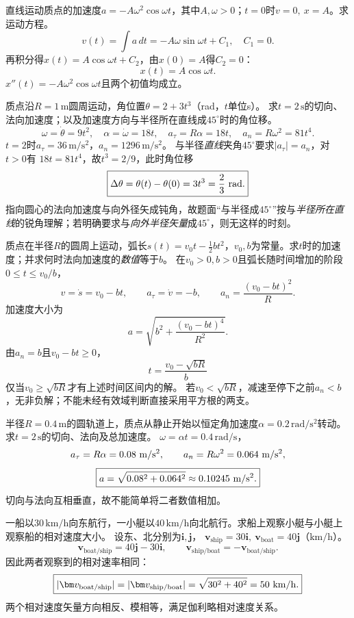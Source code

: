 \problemtext 直线运动质点的加速度$a=-A\omega^2\cos\omega t$，其中$A,\omega>0$；$t=0$时$v=0,\ x=A$。求运动方程。
\workings
\[
v(t)=\int a\,dt=-A\omega\sin\omega t+C_1,\quad C_1=0.
\]
再积分得$x(t)=A\cos\omega t+C_2$，由$x(0)=A$得$C_2=0$：
\[
\boxed{x(t)=A\cos\omega t.}
\]
\crosscheck $x''(t)=-A\omega^2\cos\omega t$且两个初值均成立。

\problemtext 质点沿$R=1\,\mathrm m$圆周运动，角位置$\theta=2+3t^3$（rad，$t$单位s）。
求$t=2\,\mathrm s$的切向、法向加速度；以及加速度方向与半径所在直线成$45^\circ$时的角位移。
\workings
\[
\omega=\dot\theta=9t^2,\quad \alpha=\dot\omega=18t,\quad
a_\tau=R\alpha=18t,\quad a_n=R\omega^2=81t^4.
\]
$t=2$时$a_\tau=36\,\mathrm{m/s^2}$，$a_n=1296\,\mathrm{m/s^2}$。
与半径\emph{直线}夹角$45^\circ$要求$|a_\tau|=a_n$，对$t>0$有
$18t=81t^4$，故$t^3=2/9$，此时角位移
\[
\boxed{\Delta\theta=\theta(t)-\theta(0)=3t^3=\frac23\ {\rm rad}.}
\]
\crosscheck 指向圆心的法向加速度与向外径矢成钝角，故题面“与半径成$45^\circ$”按与\emph{半径所在直线}的锐角理解；若明确要求与\emph{向外半径矢量}成$45^\circ$，则无这样的时刻。

\problemtext 质点在半径$R$的圆周上运动，弧长$s(t)=v_0t-\frac12bt^2$，$v_0,b$为常量。求$t$时的加速度；并求何时法向加速度的\emph{数值}等于$b$。
\workings
在$v_0>0,b>0$且弧长随时间增加的阶段$0\le t\le v_0/b$，
\[
v=\dot s=v_0-bt,\qquad
a_\tau=\dot v=-b,\qquad a_n=\frac{(v_0-bt)^2}{R}.
\]
加速度大小为
\[
a=\sqrt{b^2+\frac{(v_0-bt)^4}{R^2}}.
\]
由$a_n=b$且$v_0-bt\ge0$，
\[
\boxed{t=\frac{v_0-\sqrt{bR}}{b}}
\]
仅当$v_0\ge\sqrt{bR}$才有上述时间区间内的解。
\crosscheck 若$v_0<\sqrt{bR}$，减速至停下之前$a_n<b$，无非负解；不能未经有效域判断直接采用平方根的两支。

\problemtext 半径$R=0.4\,\mathrm m$的圆轨道上，质点从静止开始以恒定角加速度$\alpha=0.2\,\mathrm{rad/s^2}$转动。求$t=2\,\mathrm s$的切向、法向及总加速度。
\workings
$\omega=\alpha t=0.4\,\mathrm{rad/s}$，
\[
a_\tau=R\alpha=0.08\ {\rm m/s^2},\qquad
a_n=R\omega^2=0.064\ {\rm m/s^2},
\]
\[
\boxed{a=\sqrt{0.08^2+0.064^2}\approx0.10245\ {\rm m/s^2}.}
\]
\crosscheck 切向与法向互相垂直，故不能简单将二者数值相加。

\problemtext 一船以$30\,\mathrm{km/h}$向东航行，一小艇以$40\,\mathrm{km/h}$向北航行。求船上观察小艇与小艇上观察船的相对速度大小。
\workings
设东、北分别为$\bm i,\bm j$，
$\bm v_{\mathrm{ship}}=30\bm i,\ \bm v_{\mathrm{boat}}=40\bm j$（$\mathrm{km/h}$）。
\[
\bm v_{\mathrm{boat/ship}}=40\bm j-30\bm i,\qquad
\bm v_{\mathrm{ship/boat}}=-\bm v_{\mathrm{boat/ship}}.
\]
因此两者观察到的相对速率相同：
\[
\boxed{|\bm v_{\mathrm{boat/ship}}|=|\bm v_{\mathrm{ship/boat}}|
=\sqrt{30^2+40^2}=50\ {\rm km/h}.}
\]
\crosscheck 两个相对速度矢量方向相反、模相等，满足伽利略相对速度关系。
